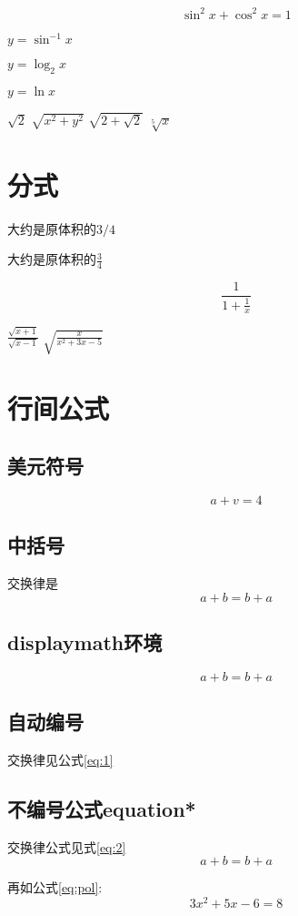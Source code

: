 \documentclass{article}
\begin{document}
    $$\sin^2 x + \cos^2 x = 1$$

    $y = \sin^{-1} x$

    $y = \log_2 x$

    $y = \ln x$

    $\sqrt{2}$
    $\sqrt{x^2 + y^2}$
    $\sqrt{2 + \sqrt{2}}$
    $\sqrt[5]{x}$
    \section{分式}
    大约是原体积的$3/4$
    
    大约是原体积的$\frac{3}{4}$

    $$\frac{1}{1+\frac{1}{x}}$$

    $\frac{\sqrt{x+1}}{\sqrt{x-1}}$
    $\sqrt{\frac{x}{x^2 + 3x -5}}$
    \section{行间公式}
    \subsection{美元符号}
    $$a + v = 4$$
    \subsection{中括号}
    交换律是\[a + b = b + a\]
    \subsection{displaymath环境}
    \begin{displaymath}
        a + b = b + a
    \end{displaymath}
    \subsection{自动编号}
    交换律见公式\ref{eq:1}
    \subsection{不编号公式equation*}
    交换律公式见式\ref{eq:2}
    \begin{equation*}
        a + b = b + a \label{eq:2}
    \end{equation*}

    再如公式\ref{eq:pol}:
    \begin{equation}
        3x^2 + 5x -6 = 8 \label{eq:pol}
    \end{equation}
\end{document}
